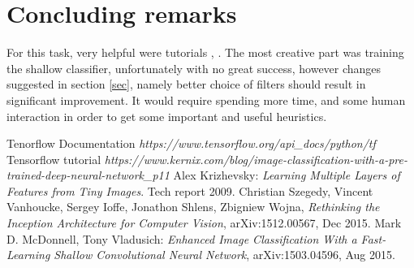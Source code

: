 \documentclass{article}
\begin{document}
\section{Concluding remarks}

For this task, very helpful were tutorials \cite{tf}, \cite{tfsvm}.
The most creative part was training the shallow classifier,
unfortunately with no great success, however changes suggested
in section \ref{sec}, namely better choice of filters
should result in significant improvement. It would require
spending more time, and some human interaction
in order to get some important and useful heuristics.




%
%

\begin{thebibliography}{1}

 Tenorflow Documentation {\em https://www.tensorflow.org/api\_docs/python/tf}
 Tensorflow tutorial {\em https://www.kernix.com/blog/image-classification-with-a-pre-trained-deep-neural-network\_p11}
 Alex Krizhevsky: {\em Learning Multiple Layers of Features from Tiny Images}. Tech report 2009.
 Christian Szegedy, Vincent Vanhoucke, Sergey Ioffe, Jonathon Shlens, Zbigniew Wojna, {\em Rethinking the Inception Architecture for Computer Vision},  arXiv:1512.00567, Dec 2015.
 Mark D. McDonnell, Tony Vladusich: {\em Enhanced Image Classification With a Fast-Learning Shallow Convolutional Neural Network},  	arXiv:1503.04596, Aug 2015.
  

\end{thebibliography}
\end{document}
